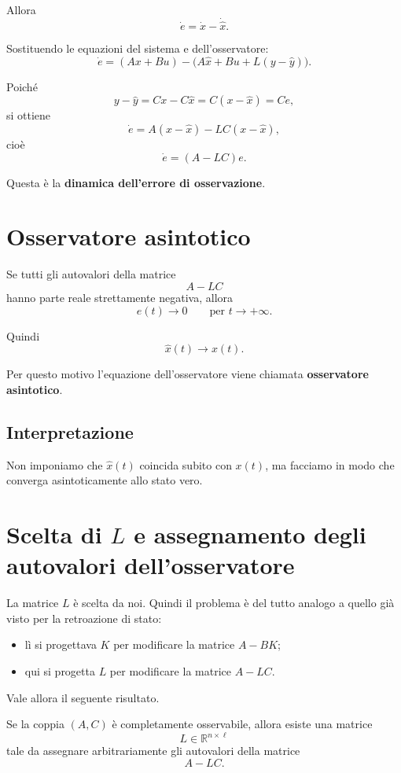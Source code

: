Allora
\[
\dot e = \dot x - \dot{\hat x}.
\]

Sostituendo le equazioni del sistema e dell'osservatore:
\[
\dot e
=
(Ax+Bu)-\bigl(A\hat x+Bu+L(y-\hat y)\bigr).
\]

Poiché
\[
y-\hat y = Cx-C\hat x = C(x-\hat x)=Ce,
\]
si ottiene
\[
\dot e = A(x-\hat x)-LC(x-\hat x),
\]
cioè
\[
\dot e = (A-LC)e.
\]

Questa è la \textbf{dinamica dell'errore di osservazione}.

\section{Osservatore asintotico}

Se tutti gli autovalori della matrice
\[
A-LC
\]
hanno parte reale strettamente negativa, allora
\[
e(t)\to 0 \qquad \text{per } t\to+\infty.
\]

Quindi
\[
\hat x(t)\to x(t).
\]

Per questo motivo l'equazione dell'osservatore viene chiamata
\textbf{osservatore asintotico}.

\subsection*{Interpretazione}

Non imponiamo che \(\hat x(t)\) coincida subito con \(x(t)\),
ma facciamo in modo che converga asintoticamente allo stato vero.

\section{Scelta di \(L\) e assegnamento degli autovalori dell'osservatore}

La matrice \(L\) è scelta da noi.  
Quindi il problema è del tutto analogo a quello già visto per la retroazione di stato:
\begin{itemize}
    \item lì si progettava \(K\) per modificare la matrice \(A-BK\);
    \item qui si progetta \(L\) per modificare la matrice \(A-LC\).
\end{itemize}

Vale allora il seguente risultato.

\begin{theorem}
Se la coppia \((A,C)\) è completamente osservabile, allora esiste una matrice
\[
L\in\mathbb{R}^{n\times \ell}
\]
tale da assegnare arbitrariamente gli autovalori della matrice
\[
A-LC.
\]
\end{theorem}

